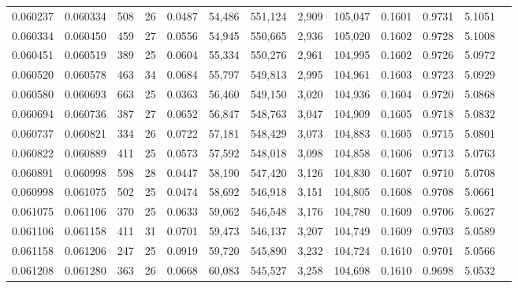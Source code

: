 \begin{tabular}{rrrrrrrrrrrrr}
0.060237 & 0.060334 & 508 &  26 &                                     0.0487 &  54,486 & 551,124 &   2,909 & 105,047 & 0.1601 & 0.9731 & 5.1051 \\
0.060334 & 0.060450 & 459 &  27 &                                     0.0556 &  54,945 & 550,665 &   2,936 & 105,020 & 0.1602 & 0.9728 & 5.1008 \\
0.060451 & 0.060519 & 389 &  25 &                                     0.0604 &  55,334 & 550,276 &   2,961 & 104,995 & 0.1602 & 0.9726 & 5.0972 \\
0.060520 & 0.060578 & 463 &  34 &                                     0.0684 &  55,797 & 549,813 &   2,995 & 104,961 & 0.1603 & 0.9723 & 5.0929 \\
0.060580 & 0.060693 & 663 &  25 &                                     0.0363 &  56,460 & 549,150 &   3,020 & 104,936 & 0.1604 & 0.9720 & 5.0868 \\
0.060694 & 0.060736 & 387 &  27 &                                     0.0652 &  56,847 & 548,763 &   3,047 & 104,909 & 0.1605 & 0.9718 & 5.0832 \\
0.060737 & 0.060821 & 334 &  26 &                                     0.0722 &  57,181 & 548,429 &   3,073 & 104,883 & 0.1605 & 0.9715 & 5.0801 \\
0.060822 & 0.060889 & 411 &  25 &                                     0.0573 &  57,592 & 548,018 &   3,098 & 104,858 & 0.1606 & 0.9713 & 5.0763 \\
0.060891 & 0.060998 & 598 &  28 &                                     0.0447 &  58,190 & 547,420 &   3,126 & 104,830 & 0.1607 & 0.9710 & 5.0708 \\
0.060998 & 0.061075 & 502 &  25 &                                     0.0474 &  58,692 & 546,918 &   3,151 & 104,805 & 0.1608 & 0.9708 & 5.0661 \\
0.061075 & 0.061106 & 370 &  25 &                                     0.0633 &  59,062 & 546,548 &   3,176 & 104,780 & 0.1609 & 0.9706 & 5.0627 \\
0.061106 & 0.061158 & 411 &  31 &                                     0.0701 &  59,473 & 546,137 &   3,207 & 104,749 & 0.1609 & 0.9703 & 5.0589 \\
0.061158 & 0.061206 & 247 &  25 &                                     0.0919 &  59,720 & 545,890 &   3,232 & 104,724 & 0.1610 & 0.9701 & 5.0566 \\
0.061208 & 0.061280 & 363 &  26 &                                     0.0668 &  60,083 & 545,527 &   3,258 & 104,698 & 0.1610 & 0.9698 & 5.0532 \\

\end{tabular}
